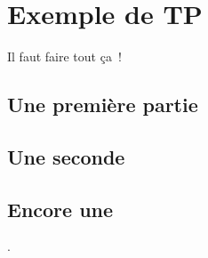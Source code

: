 \documentclass{book}
\begin{document}
\chapter{Exemple de TP}

\begin{objectif}
	Il faut faire tout ça~!
\end{objectif}

\section{Une première partie}
\lipsum[1]

\correction{\lipsum[3]}

\section{Une seconde}
\lipsum[1]

\section{Encore une}
\lipsum[2].
\end{document}
